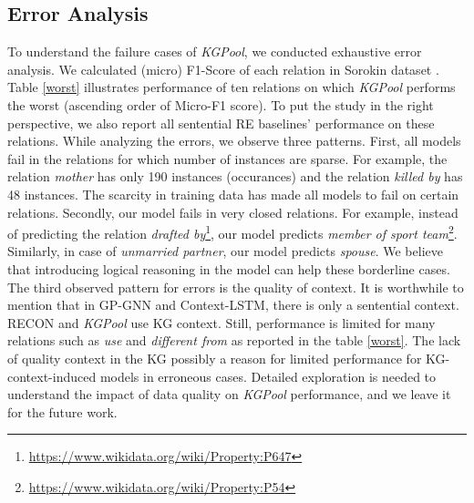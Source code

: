 \documentclass[11pt,a4paper]{article}
\begin{document}
\subsection{Error Analysis}
To understand the failure cases of \textit{KGPool}, we conducted exhaustive error analysis. We calculated (micro) F1-Score of each relation in Sorokin dataset \cite{DBLP:conf/emnlp/SorokinG17}. Table \ref{worst} illustrates performance of ten relations on which \textit{KGPool} performs the worst (ascending order of Micro-F1 score). To put the study in the right perspective, we also report all sentential RE baselines' performance on these relations. While analyzing the errors, we observe three patterns. First, all models fail in the relations for which number of instances are sparse. For example, the relation \textit{mother} has only 190 instances (occurances) and the relation \textit{killed by} has 48 instances. The scarcity in training data has made all models to fail on certain relations. 
Secondly, our model fails in very closed relations. For example, instead of predicting the relation \textit{drafted by}\footnote{\url{https://www.wikidata.org/wiki/Property:P647}}, our model predicts \textit{member of sport team}\footnote{ \url{https://www.wikidata.org/wiki/Property:P54}}. Similarly, in case of \textit{unmarried partner}, our model predicts \textit{spouse}. We believe that introducing logical reasoning in the model can help these borderline cases. The third observed pattern for errors is the quality of context. It is worthwhile to mention that in GP-GNN and Context-LSTM, there is only a sentential context. RECON and \textit{KGPool} use KG context. Still, performance is limited for many relations such as \textit{use} and \textit{different from} as reported in the table \ref{worst}. The lack of quality context in the KG possibly a reason for limited performance for KG-context-induced models in erroneous cases. Detailed exploration is needed to understand the impact of data quality on \textit{KGPool} performance, and we leave it for the future work. 
\end{document}
